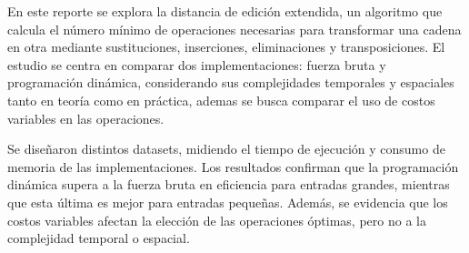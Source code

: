 
En este reporte se explora la distancia de edición extendida, 
un algoritmo que 
calcula el número mínimo de operaciones necesarias 
para transformar una cadena en otra mediante sustituciones, 
inserciones, eliminaciones y transposiciones. 
El estudio se centra en comparar dos implementaciones:
fuerza bruta y programación dinámica, considerando sus 
complejidades temporales y espaciales tanto en teoría como
en práctica, ademas se busca comparar el uso de costos variables
en las operaciones.

Se diseñaron distintos datasets, 
midiendo el tiempo de ejecución y consumo de memoria
de las implementaciones. Los resultados confirman que la 
programación dinámica supera a la
fuerza bruta en eficiencia para entradas
grandes, mientras que esta última es mejor para entradas
pequeñas. Además, se evidencia que los costos 
variables afectan la elección de las operaciones
óptimas, pero no a la complejidad temporal o espacial.